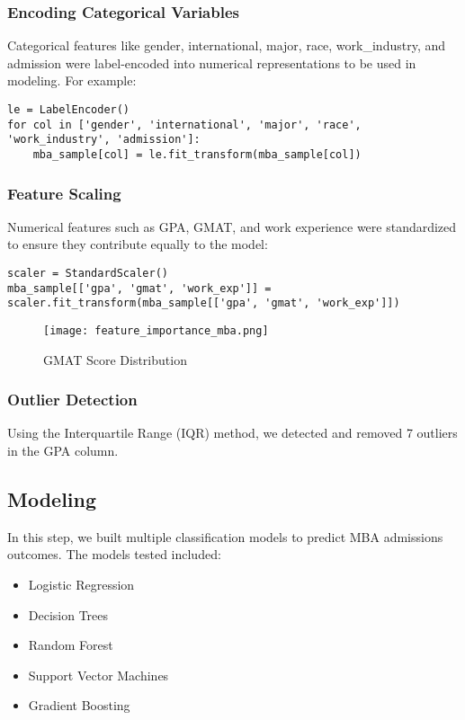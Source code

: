 \documentclass{article}
\begin{document}
\subsubsection{Encoding Categorical Variables}
Categorical features like gender, international, major, race, work\_industry, and admission were label-encoded into numerical representations to be used in modeling. For example:

\begin{verbatim}
le = LabelEncoder()
for col in ['gender', 'international', 'major', 'race', 'work_industry', 'admission']:
    mba_sample[col] = le.fit_transform(mba_sample[col])
\end{verbatim}

\subsubsection{Feature Scaling}
Numerical features such as GPA, GMAT, and work experience were standardized to ensure they contribute equally to the model:

\begin{verbatim}
scaler = StandardScaler()
mba_sample[['gpa', 'gmat', 'work_exp']] = scaler.fit_transform(mba_sample[['gpa', 'gmat', 'work_exp']])
\end{verbatim}

\begin{figure}[h]
    \centering
    \texttt{[image: feature\_importance\_mba.png]}
    \caption{GMAT Score Distribution}
\end{figure}


\subsubsection{Outlier Detection}
Using the Interquartile Range (IQR) method, we detected and removed 7 outliers in the GPA column.

\subsection{Modeling}

In this step, we built multiple classification models to predict MBA admissions outcomes. The models tested included:
\begin{itemize}
    \item Logistic Regression
    \item Decision Trees
    \item Random Forest
    \item Support Vector Machines
    \item Gradient Boosting
\end{itemize}
\end{document}
